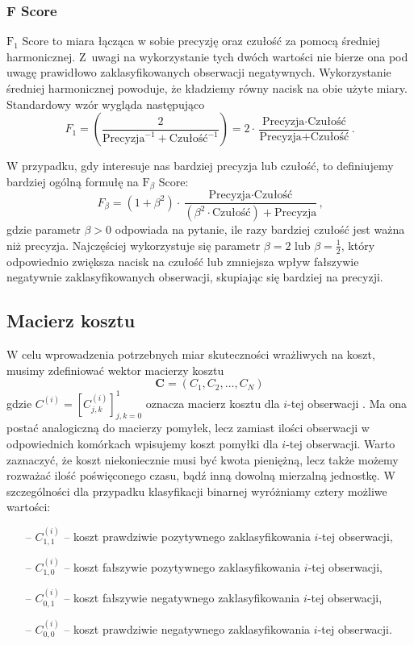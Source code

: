 \documentclass[inzynierska]{pwr_wmat_praca_dyplomowa}
\theoremstyle{plain}
\numberwithin{theorem}{chapter}
\theoremstyle{definition}
\numberwithin{theorem}{chapter}
\begin{document}
\subsubsection{F Score}
$\text{F}_1$ Score to miara łącząca w sobie precyzję oraz czułość za pomocą średniej harmonicznej. Z~uwagi na wykorzystanie tych dwóch wartości nie bierze ona pod uwagę prawidłowo zaklasyfikowanych obserwacji negatywnych. Wykorzystanie średniej harmonicznej powoduje, że kładziemy równy nacisk na obie użyte miary. Standardowy wzór wygląda następująco
$$ F_1 = \left(\frac{2}{\text{Precyzja}^{-1} + \text{Czułość}^{-1}}\right) = 2 \cdot \frac{\text{Precyzja} \cdot \text{Czułość}}{\text{Precyzja} + \text{Czułość}} \text{.}$$

W przypadku, gdy interesuje nas bardziej precyzja lub czułość, to definiujemy bardziej ogólną formułę na $\text{F}_{\beta}$ Score:
$$ F_{\beta} = (1 + \beta^2) \cdot \frac{\text{Precyzja} \cdot \text{Czułość}}{(\beta^2 \cdot \text{Czułość}) + \text{Precyzja}} \text{,}$$
gdzie parametr $\beta>0$ odpowiada na pytanie, ile razy bardziej czułość jest ważna niż precyzja. Najczęściej wykorzystuje się parametr $\beta = 2$ lub $\beta = \frac{1}{2}$, który odpowiednio zwiększa nacisk na czułość lub zmniejsza wpływ fałszywie negatywnie zaklasyfikowanych obserwacji, skupiając się bardziej na precyzji.

\subsection{Macierz kosztu}
\label{sec:macierz-kosztu}
W celu wprowadzenia potrzebnych miar skuteczności wrażliwych na koszt, musimy zdefiniować wektor macierzy kosztu
$$ \boldsymbol{C} = (C_1, C_2, \dots, C_N) $$
gdzie $ C^{(i)} = [C^{(i)}_{j,k}]_{j,k=0}^1 $ oznacza macierz kosztu dla $i$-tej obserwacji \cite{CSCCFD, CS-Learning}. Ma ona postać analogiczną do macierzy pomyłek, lecz zamiast ilości obserwacji w odpowiednich komórkach wpisujemy koszt pomyłki dla $i$-tej obserwacji. Warto zaznaczyć, że koszt niekoniecznie musi być kwota pieniężną, lecz także możemy rozważać ilość poświęconego czasu, bądź inną dowolną mierzalną jednostkę. W szczególności dla przypadku klasyfikacji binarnej wyróżniamy cztery możliwe wartości:
\begin{itemize}
	\item[--] $C^{(i)}_{1,1}$ -- koszt prawdziwie pozytywnego zaklasyfikowania $i$-tej obserwacji,
	\item[--] $C^{(i)}_{1,0}$ -- koszt fałszywie pozytywnego zaklasyfikowania $i$-tej obserwacji,
	\item[--] $C^{(i)}_{0,1}$ -- koszt fałszywie negatywnego zaklasyfikowania $i$-tej obserwacji,
	\item[--] $C^{(i)}_{0,0}$ -- koszt prawdziwie negatywnego zaklasyfikowania $i$-tej obserwacji.
\end{itemize}
\end{document}
